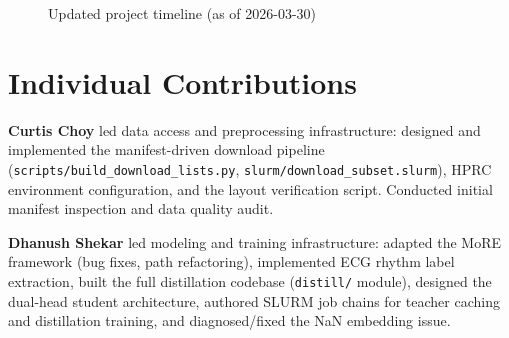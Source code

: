 \documentclass[sigconf,nonacm]{acmart}
\begin{document}
\begin{figure}[h]
\centering
{}
\caption{Updated project timeline (as of 2026-03-30)}
\label{fig:gantt}
\end{figure}

\section{Individual Contributions}

\textbf{Curtis Choy} led data access and preprocessing infrastructure:
designed and implemented the manifest-driven download pipeline
(\texttt{scripts/build\_download\_lists.py},
\texttt{slurm/download\_subset.slurm}), HPRC environment configuration,
and the layout verification script. Conducted initial manifest inspection
and data quality audit.

\textbf{Dhanush Shekar} led modeling and training infrastructure:
adapted the MoRE framework (bug fixes, path refactoring), implemented
ECG rhythm label extraction, built the full distillation codebase
(\texttt{distill/} module), designed the dual-head student architecture,
authored SLURM job chains for teacher caching and distillation training,
and diagnosed/fixed the NaN embedding issue.
\end{document}
